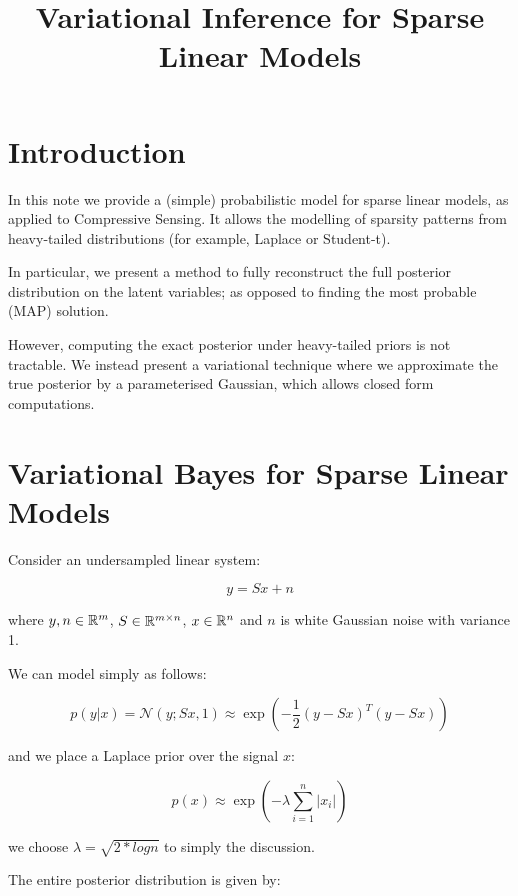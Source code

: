 \documentclass{article}
\title{Variational Inference for Sparse Linear Models}
\begin{document}
\maketitle

\section{Introduction}
In this note we provide a (simple) probabilistic model for sparse linear models, as applied to Compressive Sensing. It allows the modelling of sparsity patterns from heavy-tailed distributions (for example, Laplace or Student-t).

In particular, we present a method to fully reconstruct the full posterior distribution on the latent variables; as opposed to finding the most probable (MAP) solution. 

However, computing the exact posterior under heavy-tailed priors is not tractable. We instead present a variational technique where we approximate the true posterior by a parameterised Gaussian, which allows closed form computations. 

\section{Variational Bayes for Sparse Linear Models}

Consider an undersampled linear system:

\begin{equation}
y = Sx + n 
\end{equation}

where \(y, n \in {\mathbb{R}}^{m}\), \(S \in {\mathbb{R}}^{m \times n}\), \(x \in {\mathbb{R}}^n\) and \(n\) is white Gaussian noise with variance 1.

We can model simply as follows:

\begin{equation}
p\left(y|x\right) = \mathcal{N}\left(y;Sx,1\right) \approx \exp\left( -\frac{1}{2}\left(y-Sx\right)^T\left(y-Sx\right) \right)
\end{equation}

and we place a Laplace prior over the signal \(x\):

\begin{equation}
p\left(x\right) \approx \exp\left(-\lambda	\sum	_{i=1}^n |x_i| \right)
\end{equation}

we choose \(\lambda = \sqrt{2*log{n}}\) to simply the discussion.

The entire posterior distribution is given by:
\end{document}
